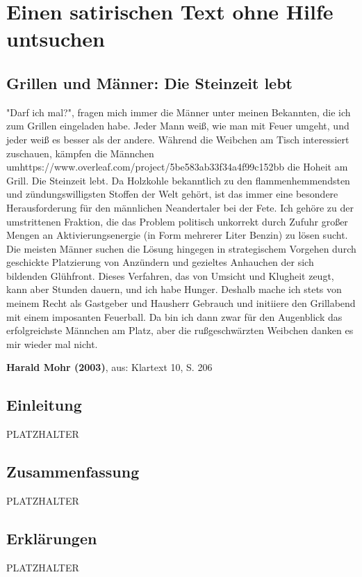 \documentclass[12pt,a4paper]{scrartcl}
\begin{document}
\section{Einen satirischen Text ohne Hilfe untsuchen} 
\begin{linenumbers}
\subsection*{Grillen und Männer: Die Steinzeit lebt} 
"Darf ich mal?", fragen mich immer die Männer unter meinen Bekannten, die ich zum Grillen eingeladen habe. Jeder Mann weiß, wie man mit Feuer umgeht, und jeder weiß es besser als der andere. Während die Weibchen am Tisch interessiert zuschauen, kämpfen die Männchen umhttps://www.overleaf.com/project/5be583ab33f34a4f99c152bb die Hoheit am Grill. Die Steinzeit lebt. Da Holzkohle bekanntlich zu den flammenhemmendsten und zündungswilligsten Stoffen der Welt gehört, ist das immer eine besondere Herausforderung für den männlichen Neandertaler bei der Fete. Ich gehöre zu der umstrittenen Fraktion, die das Problem politisch unkorrekt durch Zufuhr großer Mengen an Aktivierungsenergie (in Form mehrerer Liter Benzin) zu lösen sucht. Die meisten Männer suchen die Lösung hingegen in strategischem Vorgehen durch geschickte Platzierung von Anzündern und gezieltes Anhauchen der sich bildenden Glühfront. Dieses Verfahren, das von Umsicht und Klugheit zeugt, kann aber Stunden dauern, und ich habe Hunger. Deshalb mache ich stets von meinem Recht als Gastgeber und Hausherr Gebrauch und initiiere den Grillabend mit einem imposanten Feuerball. Da bin ich dann zwar für den Augenblick das erfolgreichste Männchen am Platz, aber die rußgeschwärzten Weibchen danken es mir wieder mal nicht.
\end{linenumbers}
\textbf{Harald Mohr (2003)}, aus: Klartext 10, S. 206
\subsection{Einleitung}
PLATZHALTER


\subsection{Zusammenfassung} 
PLATZHALTER


\subsection{Erklärungen} 
PLATZHALTER
\end{document}
